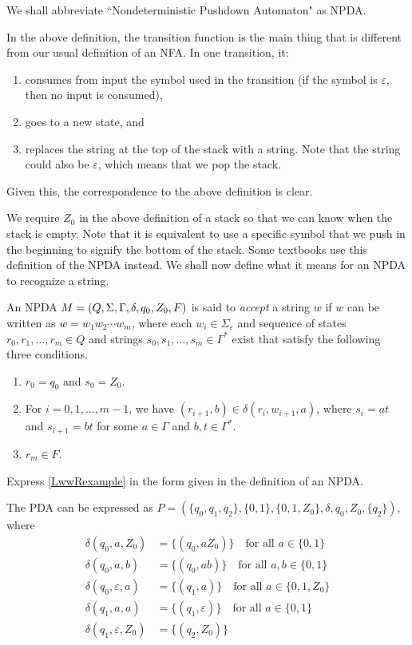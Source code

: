 \vspace{2mm}
We shall abbreviate ``Nondeterministic Pushdown Automaton" as NPDA.

In the above definition, the transition function is the main thing that is different from our usual definition of an NFA. In one transition, it:
\begin{enumerate}
    \item consumes from input the symbol used in the transition (if the symbol is $\varepsilon$, then no input is consumed),
    \item goes to a new state, and
    \item replaces the string at the top of the stack with a string. Note that the string could also be $\varepsilon$, which means that we pop the stack.
\end{enumerate}
Given this, the correspondence to the above definition is clear.

We require $Z_0$ in the above definition of a stack so that we can know when the stack is empty. Note that it is equivalent to use a specific symbol that we push in the beginning to signify the bottom of the stack. Some textbooks use this definition of the NPDA instead. We shall now define what it means for an NPDA to recognize a string.

\begin{definition}
An NPDA $M=(Q,\Sigma,\Gamma,\delta,q_0,Z_0,F)$ is said to \textit{accept} a string $w$ if $w$ can be written as $w=w_1w_2\cdots w_m$, where each $w_i\in\Sigma_\varepsilon$ and sequence of states $r_0,r_1,\ldots,r_m\in Q$ and strings $s_0,s_1,\ldots,s_m\in\Gamma^*$ exist that satisfy the following three conditions.
\begin{enumerate}
    \item $r_0=q_0$ and $s_0=Z_0$.
    \item For $i=0,1,\ldots,m-1$, we have $(r_{i+1},b)\in\delta(r_i,w_{i+1},a)$, where $s_i=at$ and $s_{i+1}=bt$ for some $a\in\Gamma$ and $b,t\in\Gamma^*$.
    \item $r_m\in F$.
\end{enumerate}
\end{definition}

\begin{exercise}
\label{LwwRexercise}
Express \ref{LwwRexample} in the form given in the definition of an NPDA. 
\end{exercise}
\begin{solution}
The PDA can be expressed as $P=(\{q_0,q_1,q_2\}, \{0,1\}, \{0,1,Z_0\}, \delta, q_0,Z_0, \{q_2\})$, where
\begin{align*}
    \delta(q_0,a,Z_0) &= \{(q_0,aZ_0)\}\quad\text{for all $a\in\{0,1\}$} \\
    \delta(q_0,a,b) &= \{(q_0,ab)\}\quad\text{for all $a,b\in\{0,1\}$} \\
    \delta(q_0,\varepsilon,a) &= \{(q_1,a)\}\quad\text{for all $a\in\{0,1,Z_0\}$} \\
    \delta(q_1,a,a) &= \{(q_1,\varepsilon)\}\quad\text{for all $a\in\{0,1\}$} \\
    \delta(q_1,\varepsilon,Z_0) &= \{(q_2,Z_0)\}
\end{align*}
\end{solution}

